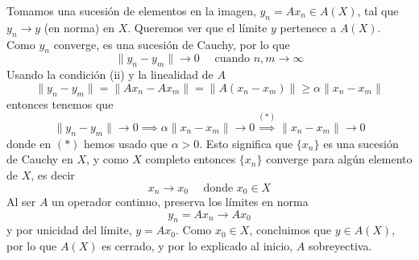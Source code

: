 \begin{ejercicio}
\begin{description}
\begin{itemize}
            Tomamos una sucesión de elementos en la imagen, $y_n = Ax_n \in A(X)$, tal que $y_n \to y$ (en norma) en $X$. Queremos ver que el límite $y$ pertenece a $A(X)$. Como $y_n$ converge, es una sucesión de Cauchy, por lo que 
            $$\|y_n - y_m\| \to 0 \quad \text{ cuando } n,m \to \infty$$
            Usando la condición (ii) y la linealidad de $A$
            $$\|y_n - y_m\| = \|Ax_n - Ax_m\| = \|A(x_n - x_m)\| \geq \alpha \|x_n - x_m\|$$
            entonces tenemos que
            \begin{equation*}
                \|y_n - y_m\| \to 0 \implies \alpha \|x_n - x_m\| \to 0  \overset{(*)}{\implies} \|x_n - x_m\| \to 0
            \end{equation*}
            donde en $(*)$ hemos usado que $\alpha > 0$. Esto significa que $\{x_n\}$ es una sucesión de Cauchy en $X$, y como $X$ completo entonces $\{x_n\}$ converge para algún elemento de $X$, es decir
            $$x_n \to x_0 \quad \text{ donde }x_0 \in X$$ 
            Al ser $A$ un operador continuo, preserva los límites en norma 
            $$y_n = Ax_n \to Ax_0$$ 
            y por unicidad del límite, $y = Ax_0$. Como $x_0 \in X$, concluimos que $y \in A(X)$, por lo que $A(X)$ es cerrado, y por lo explicado al inicio, $A$ sobreyectiva.
        \end{itemize}
    \end{description}
\end{ejercicio}

